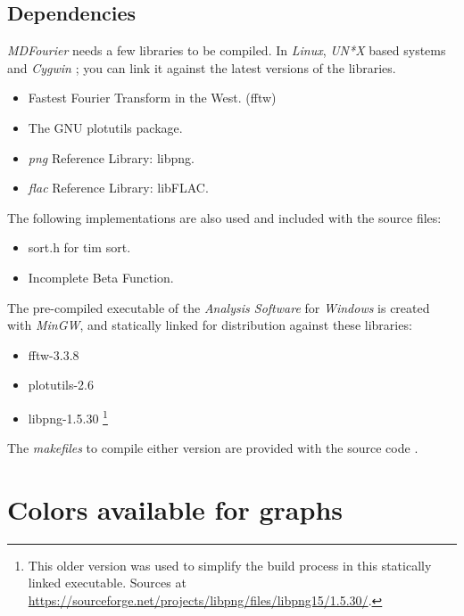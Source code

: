 \documentclass[10pt,a4paper]{report}
\newcommand{\ac}[1]{\textit{\acrshort{#1}}}
\begin{document}
\begin{appendices}
\section{Dependencies}

\textit{MDFourier} needs a few libraries to be compiled. In \textit{Linux}, \textit{UN*X} based systems and \textit{Cygwin} \cite{cygwin}; you can link it against the latest versions of the libraries. 

\begin{itemize}
	\item Fastest Fourier Transform in the West. (fftw) \cite{fftw}
	\item The GNU plotutils package. \cite{libplot}
	\item \ac{png} Reference Library: libpng. \cite{libpng}
	\item \ac{flac} Reference Library: libFLAC. \cite{libflac}
\end{itemize}

The following implementations are also used and included with the source files:

\begin{itemize}
	\item sort.h for tim sort. \cite{sort}
	\item Incomplete Beta Function. \cite{betafunction}
\end{itemize}

The pre-compiled executable of the \textit{Analysis Software} for \textit{Windows} is created with \textit{MinGW}\cite{mingw}, and statically linked for distribution against these libraries:

\begin{itemize}
	\item fftw-3.3.8 \cite{fftw}
	\item plotutils-2.6 \cite{libplot}
	\item libpng-1.5.30 \footnote{This older version was used to simplify the build process in this statically linked executable. Sources at \url{https://sourceforge.net/projects/libpng/files/libpng15/1.5.30/}.}
\end{itemize}

The \textit{makefiles} to compile either version are provided with the source code \cite{sourcecode}.

\chapter{Colors available for graphs}
\label{availablecolors}


\end{appendices}
\end{document}
